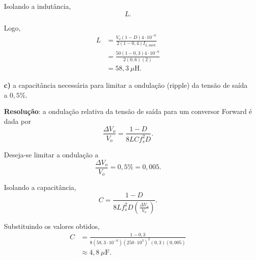 Isolando a indutância,
\begin{equation*}
	L
	.
\end{equation*}

Logo,
\begin{equation*}
	\begin{aligned}
		L
		&=
		\frac{V_o(1-D)4\cdot10^{-6}}
		{2(1-0{,}4)I_{L,\mathrm{med}}}\\
		&=\frac{50(1-0{,}3)4\cdot10^{-6}}
		{2(0{,}6)(2)}\\
		&=
		58{,}3~\mu\mathrm{H}.
	\end{aligned}
\end{equation*}

\medskip
\textbf{c)} a capacitância necessária para limitar a ondulação (ripple) da tensão de saída a $0{,}5\%$.

\medskip
\textbf{Resolução}: a ondulação relativa da tensão de saída para um conversor Forward é dada por~\cite{forward_notas}
\begin{equation*}
	\frac{\Delta V_o}{V_o}
	=
	\frac{1-D}{8LCf_s^2D}.
\end{equation*}

Deseja-se limitar a ondulação a
\begin{equation*}
	\frac{\Delta V_o}{V_o}=0{,}5\%=0{,}005.
\end{equation*}

Isolando a capacitância,
\begin{equation*}
	C
	=
	\frac{1-D}
	{8L f_s^2D
		\left(\frac{\Delta V_o}{V_o}\right)}.
\end{equation*}

Substituindo os valores obtidos,
\begin{equation*}
	\begin{aligned}
		C
		&=
		\frac{1-0{,}3}
		{8(58{,}3\cdot10^{-6})
			(250\cdot10^3)^2(0{,}3)(0{,}005)}
		\\
		&\approx4{,}8~\mu\mathrm{F}.
	\end{aligned}
\end{equation*}

